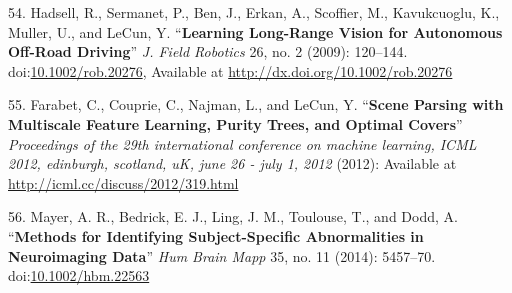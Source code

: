 \documentclass[11pt,]{article}
\begin{document}
\hypertarget{ref-HadsellSBESKML09}{}
54. Hadsell, R., Sermanet, P., Ben, J., Erkan, A., Scoffier, M.,
Kavukcuoglu, K., Muller, U., and LeCun, Y. ``\textbf{Learning Long-Range
Vision for Autonomous Off-Road Driving}'' \emph{J. Field Robotics} 26,
no. 2 (2009): 120--144.
doi:\href{https://doi.org/10.1002/rob.20276}{10.1002/rob.20276},
Available at \url{http://dx.doi.org/10.1002/rob.20276}

\hypertarget{ref-FarabetCNL12}{}
55. Farabet, C., Couprie, C., Najman, L., and LeCun, Y. ``\textbf{Scene
Parsing with Multiscale Feature Learning, Purity Trees, and Optimal
Covers}'' \emph{Proceedings of the 29th international conference on
machine learning, ICML 2012, edinburgh, scotland, uK, june 26 - july 1,
2012} (2012): Available at \url{http://icml.cc/discuss/2012/319.html}

\hypertarget{ref-Mayer:2014aa}{}
56. Mayer, A. R., Bedrick, E. J., Ling, J. M., Toulouse, T., and Dodd,
A. ``\textbf{Methods for Identifying Subject-Specific Abnormalities in
Neuroimaging Data}'' \emph{Hum Brain Mapp} 35, no. 11 (2014): 5457--70.
doi:\href{https://doi.org/10.1002/hbm.22563}{10.1002/hbm.22563}
\end{document}
